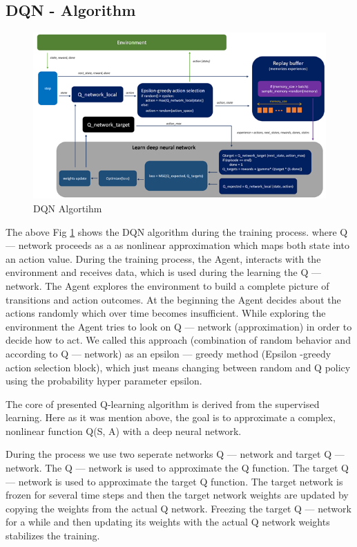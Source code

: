 \documentclass[11pt]{article}
\begin{document}
\subsection{DQN - Algorithm}

\begin{figure}[h]
    \centering
    \includegraphics[width=1.0\textwidth]{dqn}
    \caption{DQN Algortihm}
    \label{fig:dqn}
\end{figure}

The above Fig \ref{fig:dqn} shows the DQN algorithm during the training process. 
where Q — network proceeds as a as nonlinear approximation which maps both state into an action value.
During the training process, the Agent, interacts with the environment and receives data, which is used during the learning the Q — network. The Agent explores the environment to build a complete picture of transitions and action outcomes. At the beginning the Agent decides about the actions randomly which over time becomes insufficient. While exploring the environment the Agent tries to look on Q — network (approximation) in order to decide how to act. 
We called this approach (combination of random behavior and according to Q — network) as an epsilon — greedy method (Epsilon -greedy action selection block), which just means changing between random and Q policy using the probability hyper parameter epsilon.

The core of presented Q-learning algorithm is derived from the supervised learning.
Here as it was mention above, the goal is to approximate a complex, nonlinear function Q(S, A) with a deep neural network.

During the process we use two seperate networks Q — network and target Q — network. The Q — network is used to approximate the Q function. The target Q — network is used to approximate the target Q function.
The target network is frozen for several time steps and then the target network weights are updated by copying the weights from the actual Q network. 
Freezing the target Q — network for a while and then updating its weights with the actual Q network weights stabilizes the training.
\end{document}
